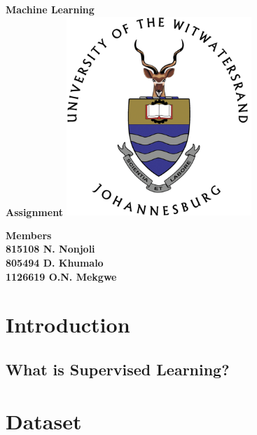 \documentclass[12pt]{article}
\begin{document}
	
	\begin{titlepage}
		
		\centering
		
		{\bfseries\LARGE
			Machine Learning\\
			Assignment
		}
		\vfill
		\includegraphics[width=7cm]{img/logo.png}
		\vfill
		\begin{center}
			{\bfseries\LARGE Members}\\
			{\bfseries\large
				815108 N. Nonjoli\\
				805494 D. Khumalo\\
				1126619 O.N. Mekgwe\\
			}
		\end{center}
		\vfill
		\thispagestyle{empty}
	\end{titlepage}

	\tableofcontents
	\thispagestyle{empty}
	\newpage
	
	\section{Introduction}
	\setcounter{page}{1}
	\subsection{What is Supervised Learning?}
	
	\newpage
	
	\section{Dataset}
\end{document}

